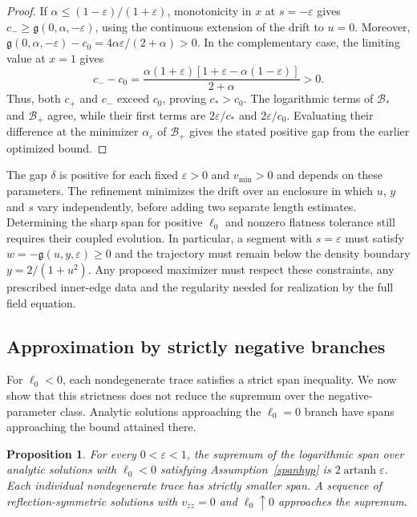 \documentclass[amsmath,amsfonts,amssymb,aps,pra,superscriptaddress,10pt]{revtex4-2}
\numberwithin{equation}{section}
\theoremstyle{plain}
\newtheorem{proposition}{Proposition}
\theoremstyle{definition}
\theoremstyle{remark}
\theoremstyle{definition}
\newcommand{\ellzero}{\ell_0}
\begin{document}
\begin{proof}
If $\alpha\leq(1-\varepsilon)/(1+\varepsilon)$, monotonicity in $x$ at $s=-\varepsilon$ gives $c_-\geq\mathfrak{g}(0,\alpha,-\varepsilon)$, using the continuous extension of the drift to $u=0$. Moreover, $\mathfrak{g}(0,\alpha,-\varepsilon)-c_0=4\alpha\varepsilon/(2+\alpha)>0$. In the complementary case, the limiting value at $x=1$ gives
\begin{equation}
c_--c_0=\frac{\alpha(1+\varepsilon)[1+\varepsilon-\alpha(1-\varepsilon)]}{2+\alpha}>0.
\end{equation}
Thus, both $c_+$ and $c_-$ exceed $c_0$, proving $c_*>c_0$. The logarithmic terms of $\mathcal{B}_*$ and $\mathcal{B}_+$ agree, while their first terms are $2\varepsilon/c_*$ and $2\varepsilon/c_0$. Evaluating their difference at the minimizer $\alpha_\varepsilon$ of $\mathcal{B}_+$ gives the stated positive gap from the earlier optimized bound.
\end{proof}

The gap $\delta$ is positive for each fixed $\varepsilon>0$ and $v_{\min}>0$ and depends on these parameters. The refinement minimizes the drift over an enclosure in which $u$, $y$ and $s$ vary independently, before adding two separate length estimates. Determining the sharp span for positive $\ellzero$ and nonzero flatness tolerance still requires their coupled evolution. In particular, a segment with $s=\varepsilon$ must satisfy $w=-\mathfrak{g}(u,y,\varepsilon)\geq 0$ and the trajectory must remain below the density boundary $y=2/(1+u^2)$. Any proposed maximizer must respect these constraints, any prescribed inner-edge data and the regularity needed for realization by the full field equation.

\subsection{Approximation by strictly negative branches}

For $\ellzero<0$, each nondegenerate trace satisfies a strict span inequality. We now show that this strictness does not reduce the supremum over the negative-parameter class. Analytic solutions approaching the $\ellzero=0$ branch have spans approaching the bound attained there.

\begin{proposition}
For every $0<\varepsilon<1$, the supremum of the logarithmic span over analytic solutions with $\ellzero<0$ satisfying Assumption~\ref{spanhyp} is $2\operatorname{artanh}{\varepsilon}$. Each individual nondegenerate trace has strictly smaller span. A sequence of reflection-symmetric solutions with $v_{zz}=0$ and $\ellzero\uparrow 0$ approaches the supremum.
\end{proposition}
\end{document}

